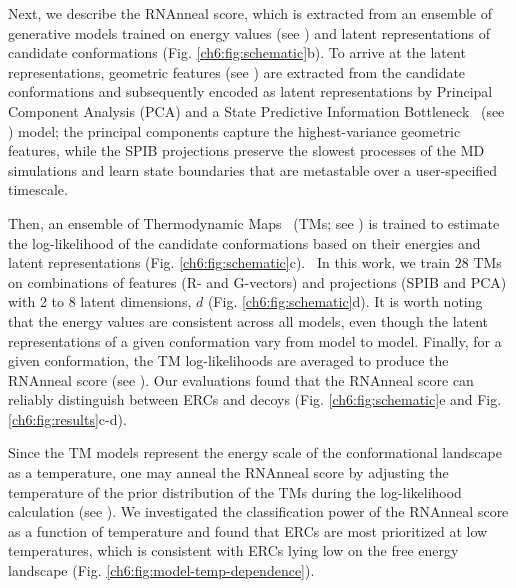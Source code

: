 Next, we describe the RNAnneal score, which is extracted from an ensemble of generative models trained on energy values (see ) and latent representations of candidate conformations (Fig. \ref{ch6:fig:schematic}b). To arrive at the latent representations, geometric features (see ) are extracted from the candidate conformations and subsequently encoded as latent representations by Principal Component Analysis (PCA) and a State Predictive Information Bottleneck~\cite{wang2021state} (see ) model; the principal components capture the highest-variance geometric features, while the SPIB projections preserve the slowest processes of the MD simulations and learn state boundaries that are metastable over a user-specified timescale.

Then, an ensemble of Thermodynamic Maps~\cite{herron2024inferring} (TMs; see ) is trained to estimate the log-likelihood of the candidate conformations based on their energies and latent representations (Fig. \ref{ch6:fig:schematic}c).~\cite{herron2024inferring} In this work, we train $28$ TMs on combinations of features (R- and G-vectors) and projections (SPIB and PCA) with 2 to 8 latent dimensions, $d$ (Fig. \ref{ch6:fig:schematic}d). It is worth noting that the energy values are consistent across all models, even though the latent representations of a given conformation vary from model to model. Finally, for a given conformation, the TM log-likelihoods are averaged to produce the RNAnneal score (see ). Our evaluations found that the RNAnneal score can reliably distinguish between ERCs and decoys (Fig. \ref{ch6:fig:schematic}e and Fig. \ref{ch6:fig:results}c-d).

Since the TM models represent the energy scale of the conformational landscape as a temperature, one may anneal the RNAnneal score by adjusting the temperature of the prior distribution of the TMs during the log-likelihood calculation (see ). We investigated the classification power of the RNAnneal score as a function of temperature and found that ERCs are most prioritized at low temperatures, which is consistent with ERCs lying low on the free energy landscape (Fig. \ref{ch6:fig:model-temp-dependence}).

